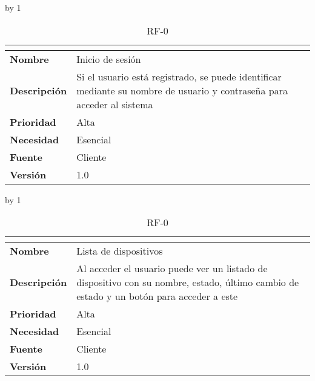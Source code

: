 \advance\rf by 1
\begin{table}[H]
	\caption{RF-0\number\rf}
	\begin{tabular}{|l|p{}|}
		\hline
		\multicolumn{2}{|c|}{\cellcolor[HTML]{BFBFBF}{\color[HTML]{000000} \textbf{RF-0\number\rf}}} \\ \hline
		\textbf{Nombre}      & Inicio de sesión                                                                                                       \\ \hline
		\textbf{Descripción} & Si el usuario está registrado, se puede identificar mediante su nombre de usuario y contraseña para acceder al sistema \\ \hline
		\textbf{Prioridad}   & Alta                                                                                                                   \\ \hline
		\textbf{Necesidad}   & Esencial                                                                                                               \\ \hline
		\textbf{Fuente}      & Cliente                                                                                                                \\ \hline
		\textbf{Versión}     & 1.0                                                                                                                    \\ \hline
	\end{tabular}
\end{table}
\advance\rf by 1
\begin{table}[H]
	\caption{RF-0\number\rf}
	\begin{tabular}{|l|p{}|}
		\hline
		\multicolumn{2}{|c|}{\cellcolor[HTML]{BFBFBF}{\color[HTML]{000000} \textbf{RF-0\number\rf}}} \\ \hline
		\textbf{Nombre}      & Lista de dispositivos                                                                                                                   \\ \hline
		\textbf{Descripción} & Al acceder el usuario puede ver un listado de dispositivo con su nombre, estado, último cambio de estado y un botón para acceder a este \\ \hline
		\textbf{Prioridad}   & Alta                                                                                                                                    \\ \hline
		\textbf{Necesidad}   & Esencial                                                                                                                                \\ \hline
		\textbf{Fuente}      & Cliente                                                                                                                                 \\ \hline
		\textbf{Versión}     & 1.0                                                                                                                                     \\ \hline
	\end{tabular}
\end{table}
